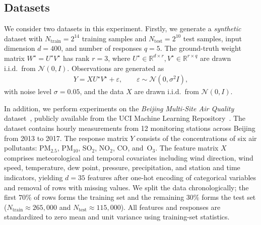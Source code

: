 \documentclass[11pt,a4paper]{article}
\numberwithin{equation}{section}%
\renewcommand{\(}{\left (}
\renewcommand{\)}{\right )}
\begin{document}
\subsection{Datasets}
We consider two datasets in this experiment.  
Firstly, 
we generate a \textit{synthetic} dataset with $N_{\mathrm{train}} = 2^{14}$ training samples and $N_{\mathrm{test}} = 2^{10}$ test samples, input dimension $d = 400$, and number of responses $q = 5$. The ground-truth weight matrix $W^{\star} = U^{\star} V^{\star}$ has rank $r = 3$, where $U^{\star} \in \mathbb{R}^{d \times r}, V^{\star} \in \mathbb{R}^{r \times q}$ are drawn i.i.d.\ from $\mathcal{N}(0, I)$. Observations are generated as
\begin{align}
    Y = X U^{\star} V^{\star} + \varepsilon, \qquad \varepsilon \sim \mathcal{N}(0, \sigma^2 I),
\end{align}
with noise level $\sigma = 0.05$, and the data $X$ are drawn i.i.d.\ from $\mathcal{N}(0, I)$.


In addition, 
we perform experiments on the \textit{Beijing Multi-Site Air Quality} dataset~\cite{beijing_air_quality}, publicly available from the UCI Machine Learning Repository~\cite{uci_ml_repository}. The dataset contains hourly measurements from 12 monitoring stations across Beijing from 2013 to 2017. The response matrix $Y$ consists of the concentrations of six air pollutants: PM$_{2.5}$, PM$_{10}$, SO$_2$, NO$_2$, CO, and~O$_3$. The feature matrix $X$ comprises meteorological and temporal covariates including wind direction, wind speed, temperature, dew point, pressure, precipitation, and station and time indicators, yielding $d = 35$ features after one-hot encoding of categorical variables and removal of rows with missing values.
We split the data chronologically; the first $70\%$ of rows forms the training set and the remaining $30\%$ forms the test set ($N_{\mathrm{train}} \approx 265{,}000$ and $N_{\mathrm{test}} \approx 115{,}000$). All features and responses are standardized to zero mean and unit variance using training-set statistics.


\end{document}
